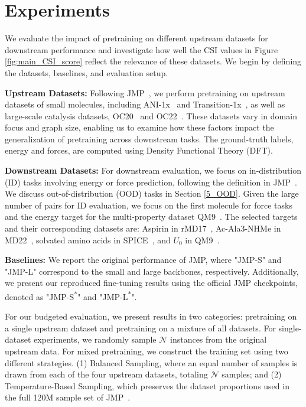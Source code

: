 
\section{Experiments}
\label{4_experiment}
We evaluate the impact of pretraining on different upstream datasets for downstream performance and investigate how well the CSI values in Figure \ref{fig:main_CSI_score} reflect the relevance of these datasets. We begin by defining the datasets, baselines, and evaluation setup.



\noindent\textbf{Upstream Datasets:} Following JMP~\cite{shoghimolecules}, we perform pretraining on upstream datasets of small molecules, including ANI-1x~\cite{smith2020ani} and Transition-1x~\cite{schreiner2022transition1x}, as well as large-scale catalysis datasets, OC20~\cite{chanussot2021open} and OC22~\cite{tran2023open}. These datasets vary in domain focus and graph size, enabling us to examine how these factors impact the generalization of pretraining across downstream tasks. The ground-truth labels, energy and forces, are computed using Density Functional Theory (DFT).

\noindent\textbf{Downstream Datasets:} For downstream evaluation, we focus on in-distribution (ID) tasks involving energy or force prediction, following the definition in JMP~\cite{shoghimolecules}. We discuss out-of-distribution (OOD) tasks in Section \ref{5_OOD}. Given the large number of pairs for ID evaluation, we focus on the first molecule for force tasks and the energy target for the multi-property dataset QM9~\cite{wu2018moleculenet}. The selected targets and their corresponding datasets are: Aspirin in rMD17~\cite{christensen2020role}, Ac-Ala3-NHMe in MD22~\cite{chmiela2023accurate}, solvated amino acids in SPICE~\cite{eastman2023spice}, and $U_0$ 
in QM9~\cite{wu2018moleculenet}. 

\noindent\textbf{Baselines:} 
We report the original performance of JMP, where "JMP-S" and "JMP-L" correspond to the small and large backbones, respectively. Additionally, we present our reproduced fine-tuning results using the official JMP checkpoints, denoted as "JMP-S\textsuperscript{*}" and "JMP-L\textsuperscript{*}".

For our budgeted evaluation, we present results in two categories: pretraining on a single upstream dataset and pretraining on a mixture of all datasets. For single-dataset experiments, we randomly sample \(\mathcal{N}\) instances from the original upstream data. For mixed pretraining, we construct the training set using two different strategies. (1) Balanced Sampling, where an equal number of samples is drawn from each of the four upstream datasets, totaling \(\mathcal{N}\) samples; and (2) Temperature-Based Sampling, which preserves the dataset proportions used in the full 120M sample set of JMP~\cite{shoghimolecules}. 



